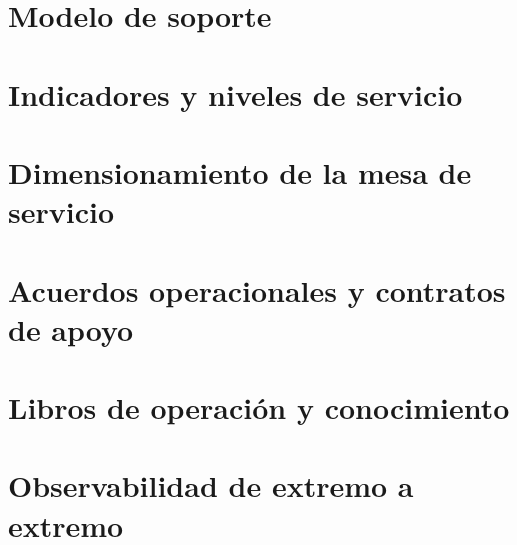 
\begin{resumenApertura}
\begin{recibe}
  \item {}
\end{recibe}
\end{resumenApertura}

\section{Modelo de soporte}\label{sec:10-modelo-de-soporte}


\section{Indicadores y niveles de servicio}\label{sec:10-indicadores-y-niveles-de-servici}


\section{Dimensionamiento de la mesa de servicio}\label{sec:10-dimensionamiento-de-la-mesa-de-s}


\section{Acuerdos operacionales y contratos de apoyo}\label{sec:10-acuerdos-operacionales-y-contrat}


\section{Libros de operación y conocimiento}\label{sec:10-libros-de-operacion-y-conocimien}


\section{Observabilidad de extremo a extremo}\label{sec:10-observabilidad-de-extremo-a-extr}

